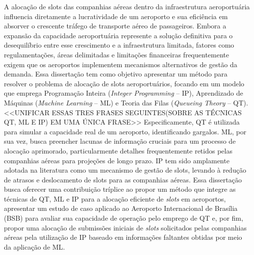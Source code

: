 A alocação de slots das companhias aéreas dentro da infraestrutura aeroportuária influencia diretamente a lucratividade de um aeroporto e sua eficiência em absorver o crescente tráfego de transporte aéreo de passageiros. Embora a expansão da capacidade aeroportuária represente a solução definitiva para o desequilíbrio entre esse crescimento e a infraestrutura limitada, fatores como regulamentações, áreas delimitadas e limitações financeiras frequentemente exigem que os aeroportos implementem mecanismos alternativos de gestão da demanda.
%
Essa dissertação tem como objetivo apresentar um método para resolver o problema de alocação de slots aeroportuários, focando em um modelo que emprega Programação Inteira (\textit{Integer Programming} -- \acrshort{IP}), Aprendizado de Máquinas (\textit{Machine Learning} -- \acrshort{ML}) e Teoria das Filas (\textit{Queueing Theory} -- \acrshort{QT}). 
%
<<UNIFICAR ESSAS TRES FRASES SEGUINTES(SOBRE AS TÉCNICAS QT, ML E IP) EM UMA ÚNICA FRASE>> Especificamente, \acrshort{QT} é utilizada para simular a capacidade real de um aeroporto, identificando gargalos. \acrshort{ML}, por sua vez, busca preencher lacunas de informação cruciais para um processo de alocação aprimorado, particularmente detalhes frequentemente retidos pelas companhias aéreas para projeções de longo prazo. \acrshort{IP} tem sido amplamente adotada na literatura como um mecanismo de gestão de slots, levando à redução de atrasos e deslocamento de slots para as companhias aéreas. 
%
%
Essa dissertação busca oferecer uma contribuição tríplice ao propor um método que integre as técnicas de QT, ML e IP para a alocação eficiente de \textit{slots} em aeroportos, apresentar um estudo de caso aplicado ao Aeroporto Internacional de Brasília (\acrshort{BSB}) para avaliar sua capacidade de operação pelo emprego de \acrshort{QT} e, por fim, propor uma alocação de submissões iniciais de \textit{slots} solicitados pelas companhias aéreas pela utilização de \acrshort{IP} baseado em informações faltantes obtidas por meio da aplicação de \acrshort{ML}.
%
